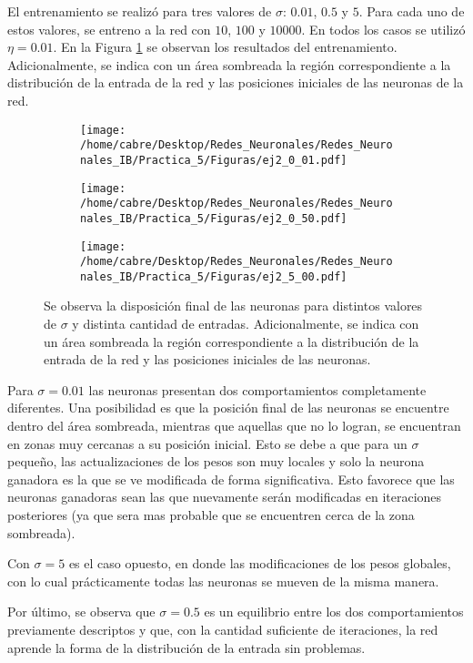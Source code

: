 El entrenamiento se realizó para tres valores de $\sigma$: $0.01$, $0.5$ y $5$. Para cada uno de estos valores, se entreno a la red con $10$, $100$ y $10000$. En todos los casos se utilizó $\eta = 0.01$. En la Figura \ref{fig:2_Resultados} se observan los resultados del entrenamiento. Adicionalmente, se indica con un área sombreada la región correspondiente a la distribución de la entrada de la red y las posiciones iniciales de las neuronas de la red.

\begin{figure}[h!]
    \centering
    \begin{subfigure}[h]{0.49\textwidth} 
        \texttt{[image: /home/cabre/Desktop/Redes\_Neuronales/Redes\_Neuronales\_IB/Practica\_5/Figuras/ej2\_0\_01.pdf]}
    \end{subfigure}       
    \begin{subfigure}[h]{0.49\textwidth} 
        \texttt{[image: /home/cabre/Desktop/Redes\_Neuronales/Redes\_Neuronales\_IB/Practica\_5/Figuras/ej2\_0\_50.pdf]}
    \end{subfigure}
    \begin{subfigure}[h]{0.49\textwidth} 
        \texttt{[image: /home/cabre/Desktop/Redes\_Neuronales/Redes\_Neuronales\_IB/Practica\_5/Figuras/ej2\_5\_00.pdf]}
    \end{subfigure}
    \caption{Se observa la disposición final de las neuronas para distintos valores de $\sigma$ y distinta cantidad de entradas. Adicionalmente, se indica con un área sombreada la región correspondiente a la distribución de la entrada de la red y las posiciones iniciales de las neuronas.}
    \label{fig:2_Resultados}
\end{figure}

Para $\sigma = 0.01$ las neuronas presentan dos comportamientos completamente diferentes. Una posibilidad es que la posición final de las neuronas se encuentre dentro del área sombreada, mientras que aquellas que no lo logran, se encuentran en zonas muy cercanas a su posición inicial. Esto se debe a que para un $\sigma$ pequeño, las actualizaciones de los pesos son muy locales y solo la neurona ganadora es la que se ve modificada de forma significativa. Esto favorece que las neuronas ganadoras sean las que nuevamente serán modificadas en iteraciones posteriores (ya que sera mas probable que se encuentren cerca de la zona sombreada).

Con $\sigma=5$ es el caso opuesto, en donde las modificaciones de los pesos globales, con lo cual prácticamente todas las neuronas se mueven de la misma manera. 

Por último, se observa que $\sigma=0.5$ es un equilibrio entre los dos comportamientos previamente descriptos y que, con la cantidad suficiente de iteraciones, la red aprende la forma de la distribución de la entrada sin problemas.